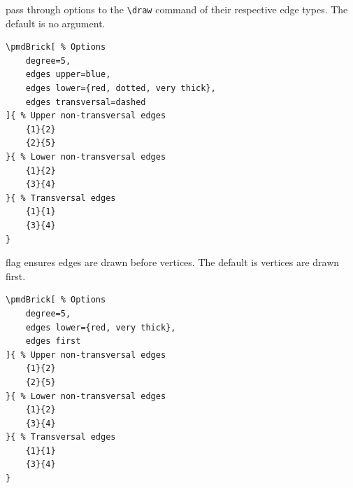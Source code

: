 \documentclass{ltxdoc}
\begin{document}
pass through options to the \verb`\draw` command of their respective edge types. The default is no argument.
\begin{center}
    \begin{minipage}{\dimexpr0.85\textwidth-2\fboxrule-2\fboxsep\relax}
        \begin{minipage}[c]{0.4\linewidth}
\begin{verbatim}
\pmdBrick[ % Options
    degree=5,
    edges upper=blue,
    edges lower={red, dotted, very thick},
    edges transversal=dashed
]{ % Upper non-transversal edges
    {1}{2}
    {2}{5}
}{ % Lower non-transversal edges
    {1}{2}
    {3}{4}
}{ % Transversal edges
    {1}{1}
    {3}{4}
}
\end{verbatim}
        \end{minipage}
        \hfill
        \begin{minipage}[c]{0.4\linewidth}
        \end{minipage}
    \end{minipage}%
\end{center}
\begin{center}
\end{center}

flag ensures edges are drawn before vertices. The default is vertices are drawn first.
\begin{center}
    \begin{minipage}{\dimexpr0.85\textwidth-2\fboxrule-2\fboxsep\relax}
        \begin{minipage}[c]{0.4\linewidth}
\begin{verbatim}
\pmdBrick[ % Options
    degree=5,
    edges lower={red, very thick},
    edges first
]{ % Upper non-transversal edges
    {1}{2}
    {2}{5}
}{ % Lower non-transversal edges
    {1}{2}
    {3}{4}
}{ % Transversal edges
    {1}{1}
    {3}{4}
}
\end{verbatim}
        \end{minipage}
        \hfill
        \begin{minipage}[c]{0.4\linewidth}
        \end{minipage}
    \end{minipage}%
\end{center}
\end{document}
